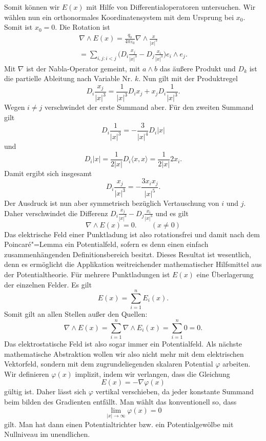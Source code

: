 \documentclass[a4paper,10pt,fleqn,twocolumn,twoside,dvipdfmx]{scrartcl}
\begin{document}
Somit können wir $E(x)$ mit Hilfe von Differentialoperatoren
untersuchen. Wir wählen nun ein orthonormales Koordinatensystem
mit dem Ursprung bei $x_0$. Somit ist $x_0=0$. Die Rotation ist%
\begin{gather*}
\nabla\wedge E(x)
= \frac{q_0}{4\pi\varepsilon_0}\nabla\wedge\frac{x}{|x|^3}\\
= \sum_{i,j\colon i<j} \Big(D_i\frac{x_j}{|x|^3}-D_j\frac{x_i}{|x|^3}\Big)
e_i\wedge e_j.
\end{gather*}
Mit $\nabla$ ist der Nabla-Operator gemeint, mit $a\wedge b$
das äußere Produkt und $D_k$ ist die partielle Ableitung nach
Variable Nr. $k$. Nun gilt mit der Produktregel%
\[D_i \frac{x_j}{|x|^3}
= \frac{1}{|x|^3}D_i x_j+x_jD_i\frac{1}{|x|^3}.\]
Wegen $i\ne j$ verschwindet der erste Summand aber.
Für den zweiten Summand gilt%
\[D_i\frac{1}{|x|^3} = -\frac{3}{|x|^4}D_i|x|\]
und
\[D_i|x| = \frac{1}{2|x|}D_i\langle x,x\rangle
= \frac{1}{2|x|} 2x_i.\]
Damit ergibt sich insgesamt
\[D_i \frac{x_j}{|x|^3}
= -\frac{3x_ix_j}{|x|^5}.\]
Der Ausdruck ist nun aber symmetrisch bezüglich Vertauschung
von $i$ und $j$. Daher verschwindet die Differenz
$D_i\frac{x_j}{|x|^3}-D_j\frac{x_i}{|x|^3}$
und es gilt%
\begin{equation}
\nabla\wedge E(x)=0.\qquad (x\ne 0)
\end{equation}
Das elektrische Feld einer Punktladung ist also rotationsfrei
und damit nach dem Poincaré"=Lemma ein Potentialfeld, sofern es
denn einen einfach zusammenhängenden Definitionsbereich besitzt. Dieses
Resultat ist wesentlich, denn es ermöglicht die Applikation
weitreichender mathematischer Hilfsmittel aus der Potentialtheorie.
Für mehrere Punktladungen ist $E(x)$ eine Überlagerung der einzelnen
Felder. Es gilt%
\[E(x) = \sum_{i=1}^n E_i(x).\]
Somit gilt an allen Stellen außer den Quellen:%
\[\nabla\wedge E(x) = \sum_{i=1}^n \nabla\wedge E_i(x)
= \sum_{i=1}^n 0 = 0.\]
Das elektrostatische Feld ist also sogar immer ein
Potentialfeld. Als nächste mathematische Abstraktion wollen wir
also nicht mehr mit dem elektrischen Vektorfeld, sondern mit
dem zugrundeliegenden skalaren Potential $\varphi$ arbeiten.
Wir definieren $\varphi(x)$ implizit, indem wir verlangen, dass die
Gleichung%
\begin{equation}\label{eq:phi-implizit}
E(x)=-\nabla\varphi(x)
\end{equation}
gültig ist. Daher lässt sich $\varphi$ vertikal verschieben, da
jeder konstante Summand beim bilden des Gradienten entfällt.
Man wählt das konventionell so, dass%
\[\lim_{|x|\rightarrow\infty}\varphi(x)=0\]
gilt. Man hat dann einen Potentialtrichter bzw.
ein Potentialgewölbe mit Nullniveau im unendlichen.
\end{document}
